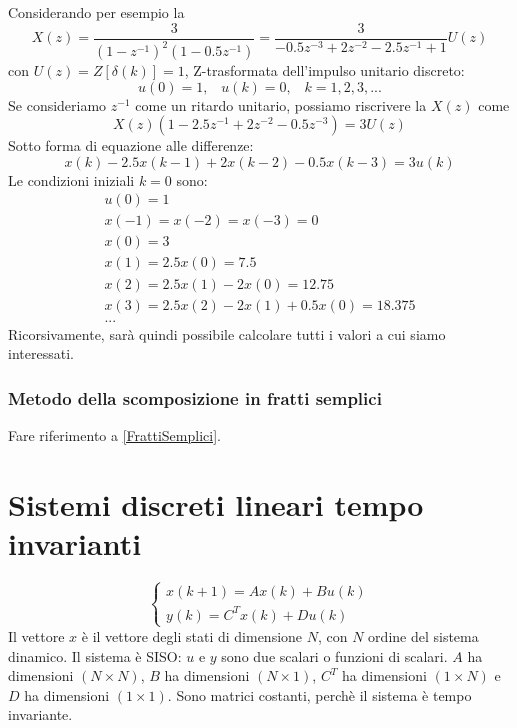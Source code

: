 \documentclass[a4paper]{report}
\begin{document}
Considerando per esempio la
\[
X(z) = \dfrac{3}{(1 - z^{-1})^2 (1 - 0.5z^{-1})} = \dfrac{3}{-0.5
  z^{-3} + 2 z^{-2} - 2.5 z^{-1} + 1} U(z)
\]
con $U(z) = Z[\delta(k)] = 1$, Z-trasformata dell'impulso unitario
discreto:
\[
u(0) = 1, \;\;\; u(k) = 0, \;\;\; k = 1, 2, 3, ...
\]
Se consideriamo $z^{-1}$ come un ritardo unitario, possiamo riscrivere
la $X(z)$ come
\[
X(z)(1 - 2.5z^{-1} + 2 z^{-2} - 0.5z^{-3}) = 3 U(z)
\]
Sotto forma di equazione alle differenze:
\[
x(k) - 2.5x(k -1) + 2x(k -2) - 0.5x(k - 3) = 3u(k)
\]
Le condizioni iniziali $k = 0$ sono:
\[
\begin{array}{l}
  u(0) = 1\\
  x(-1) = x(-2) = x(-3) = 0\\
  x(0) = 3\\
  x(1) = 2.5x(0) = 7.5\\
  x(2) = 2.5x(1) - 2x(0) = 12.75\\
  x(3) = 2.5x(2) - 2x(1) + 0.5x(0) = 18.375\\
  ...
\end{array}
\]
Ricorsivamente, sar\`a quindi possibile calcolare tutti i valori a cui
siamo interessati.

\subsection{Metodo della scomposizione in fratti semplici}
Fare riferimento a \ref{FrattiSemplici}.

\chapter{Sistemi discreti lineari tempo invarianti}
\begin{equation}
  \left\{
  \begin{array}{l}
    x(k + 1) = Ax(k) + Bu(k)\\
    y(k) = C^T x(k) + Du(k)
  \end{array}
  \right.
\end{equation}
Il vettore $x$ \`e il vettore degli stati di dimensione $N$, con $N$
ordine del sistema dinamico. Il sistema \`e SISO: $u$ e $y$ sono due
scalari o funzioni di scalari. $A$ ha dimensioni $(N \times N)$, $B$
ha dimensioni $(N \times 1)$, $C^T$ ha dimensioni $(1 \times N)$ e $D$
ha dimensioni $(1 \times 1)$. Sono matrici costanti, perch\`e il
sistema \`e tempo invariante.
\end{document}
